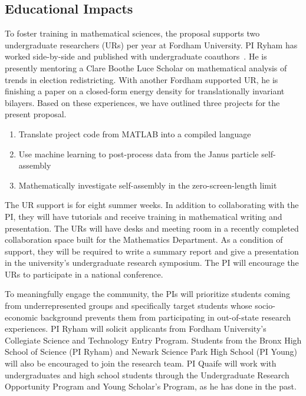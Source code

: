 \subsection{Educational Impacts}
\label{subsec:Educational_plans}
To foster training in mathematical sciences, the proposal supports two
undergraduate researchers (URs) per year at Fordham University. PI Ryham
has worked side-by-side and published with undergraduate
coauthors~\cite{RYHAM20112929, RyWaCo13, RyKlYaCo16}. He is presently
mentoring a Clare Boothe Luce Scholar on mathematical analysis of trends
in election redistricting. With another Fordham supported UR, he is
finishing a paper on a closed-form energy density for translationally
invariant bilayers. Based on these experiences, we have outlined three
projects for the present proposal.
\begin{enumerate}[noitemsep,topsep=0pt]
\item Translate project code from MATLAB into a compiled language 

\item Use machine learning to post-process data from the Janus particle self-assembly

\item Mathematically investigate self-assembly in the zero-screen-length limit
\end{enumerate}
The UR support is for eight summer weeks. In addition to collaborating
with the PI, they will have tutorials and receive training in
mathematical writing and presentation. The URs will have desks and
meeting room in a recently completed collaboration space built for the
Mathematics Department. As a condition of support, they will be required
to write a summary report and give a presentation in the university's
undergraduate research symposium. The PI will encourage the URs to
participate in a national conference.

To meaningfully engage the community, the PIs will prioritize students
coming from underrepresented groups and specifically target students
whose socio-economic background prevents them from participating in
out-of-state research experiences. PI Ryham will solicit applicants from
Fordham University's Collegiate Science and Technology Entry Program.
Students from the Bronx High School of Science (PI Ryham) and Newark
Science Park High School (PI Young) will also be encouraged to join the
research team. PI Quaife will work with undergraduates and high school
students through the Undergraduate Research Opportunity Program and
Young Scholar's Program, as he has done in the past.

